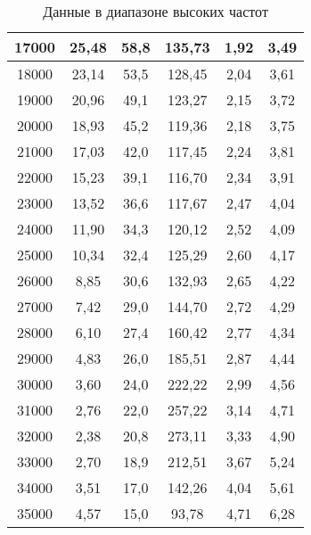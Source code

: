 \begin{table}[]
\begin{tabular}{|c|c|c|c|c|c|}
    17000   & 25,48    & 58,8      & 135,73                    & 1,92             & 3,49          \\ \hline
    18000   & 23,14    & 53,5      & 128,45                    & 2,04             & 3,61          \\ \hline
    19000   & 20,96    & 49,1      & 123,27                    & 2,15             & 3,72          \\ \hline
    20000   & 18,93    & 45,2      & 119,36                    & 2,18             & 3,75          \\ \hline
    21000   & 17,03    & 42,0      & 117,45                    & 2,24             & 3,81          \\ \hline
    22000   & 15,23    & 39,1      & 116,70                    & 2,34             & 3,91          \\ \hline
    23000   & 13,52    & 36,6      & 117,67                    & 2,47             & 4,04          \\ \hline
    24000   & 11,90    & 34,3      & 120,12                    & 2,52             & 4,09          \\ \hline
    25000   & 10,34    & 32,4      & 125,29                    & 2,60             & 4,17          \\ \hline
    26000   & 8,85     & 30,6      & 132,93                    & 2,65             & 4,22          \\ \hline
    27000   & 7,42     & 29,0      & 144,70                    & 2,72             & 4,29          \\ \hline
    28000   & 6,10     & 27,4      & 160,42                    & 2,77             & 4,34          \\ \hline
    29000   & 4,83     & 26,0      & 185,51                    & 2,87             & 4,44          \\ \hline
    30000   & 3,60     & 24,0      & 222,22                    & 2,99             & 4,56          \\ \hline
    31000   & 2,76     & 22,0      & 257,22                    & 3,14             & 4,71          \\ \hline
    32000   & 2,38     & 20,8      & 273,11                    & 3,33             & 4,90          \\ \hline
    33000   & 2,70     & 18,9      & 212,51                    & 3,67             & 5,24          \\ \hline
    34000   & 3,51     & 17,0      & 142,26                    & 4,04             & 5,61          \\ \hline
    35000   & 4,57     & 15,0      & 93,78                     & 4,71             & 6,28          \\ \hline
    \end{tabular}
    \caption{Данные в диапазоне высоких частот}
    \label{table_hight_f}
\end{table}